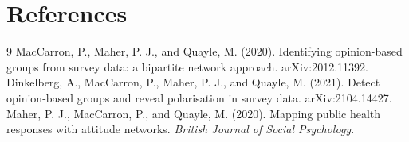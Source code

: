 \documentclass[10pt]{article}
\begin{document}
\section{References}
\renewcommand{\refname}{}
\vspace{-1.8em}
\begin{thebibliography}{9}
MacCarron, P., Maher, P. J., and Quayle, M. (2020). Identifying opinion-based groups from
survey data: a bipartite network approach. arXiv:2012.11392.
Dinkelberg, A., MacCarron, P., Maher, P. J., and Quayle, M. (2021). Detect opinion-based
groups and reveal polarisation in survey data. arXiv:2104.14427.
Maher, P. J., MacCarron, P., and Quayle, M. (2020). Mapping public health responses with
attitude networks. \emph{British Journal of Social Psychology}.
\end{thebibliography}
\end{document}

